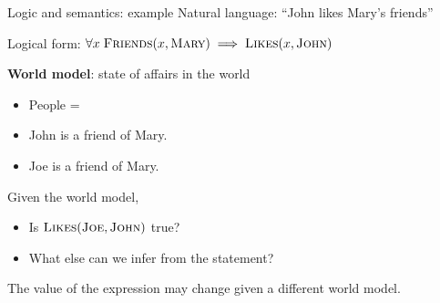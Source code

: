 \documentclass[usenames,dvipsnames,notes,11pt,aspectratio=169]{beamer}
\begin{document}
\begin{frame}
    {Logic and semantics: example}
    Natural language: ``John likes Mary's friends''

    Logical form: $\forall x \;\textsc{Friends}(x, \textsc{Mary}) \implies \textsc{Likes}(x, \textsc{John})$

    \textbf{World model}: state of affairs in the world\\
    \begin{itemize}
        \item[] People = 
        \item[] John is a friend of Mary.
        \item[] Joe is a friend of Mary.
    \end{itemize}

    Given the world model,\\
    \begin{itemize}
        \item Is $\textsc{Likes}(\textsc{Joe}, \textsc{John})$ true?
        \item What else can we infer from the statement? 
    \end{itemize}

    The value of the expression may change given a different world model.
\end{frame}
%
%
\end{document}
